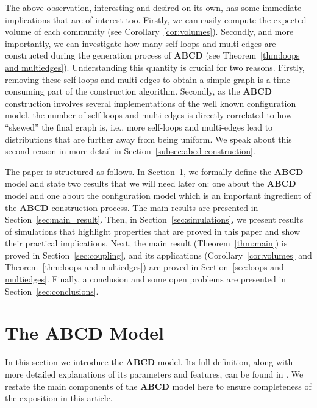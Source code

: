 \documentclass[12pt]{article}
\theoremstyle{definition}
\theoremstyle{remark}
\theoremstyle{remark}
\numberwithin{theorem}{section}
\begin{document}
The above observation, interesting and desired on its own, has some immediate implications that are of interest too. Firstly, we can easily compute the expected volume of each community (see Corollary~\ref{cor:volumes}). Secondly, and more importantly, we can investigate how many self-loops and multi-edges are constructed during the generation process of \textbf{ABCD} (see Theorem~\ref{thm:loops and multiedges}). Understanding this quantity is crucial for two reasons. Firstly, removing these self-loops and multi-edges to obtain a simple graph is a time consuming part of the construction algorithm. Secondly, as the \textbf{ABCD} construction involves several implementations of the well known configuration model, the number of self-loops and multi-edges is directly correlated to how ``skewed'' the final graph is, i.e., more self-loops and multi-edges lead to distributions that are further away from being uniform. We speak about this second reason in more detail in Section~\ref{subsec:abcd construction}.

\bigskip

The paper is structured as follows. In Section~\ref{subsec:the model}, we formally define the \textbf{ABCD} model and state two results that we will need later on: one about the \textbf{ABCD} model and one about the configuration model which is an important ingredient of the \textbf{ABCD} construction process. The main results are presented in Section~\ref{sec:main_result}. Then, in Section~\ref{sec:simulations}, we present results of simulations that highlight properties that are proved in this paper and show their practical implications. Next, the main result (Theorem~\ref{thm:main}) is proved in Section~\ref{sec:coupling}, and its applications (Corollary~\ref{cor:volumes} and Theorem~\ref{thm:loops and multiedges}) are proved in Section~\ref{sec:loops and multiedges}. Finally, a conclusion and some open problems are presented in Section~\ref{sec:conclusions}.

\section{The ABCD Model}\label{subsec:the model}

In this section we introduce the \textbf{ABCD} model. Its full definition, along with more detailed explanations of its parameters and features, can be found in \cite{kaminski2021artificial}. We restate the main components of the \textbf{ABCD} model here to ensure completeness of the exposition in this article.
\end{document}
